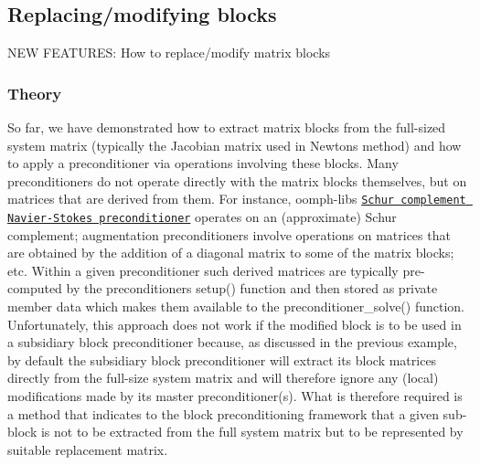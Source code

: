  

\hypertarget{index_two_plus_three_upper_triangular_with_replace}{}\subsection{Replacing/modifying blocks}\label{index_two_plus_three_upper_triangular_with_replace}
N\+EW F\+E\+A\+T\+U\+R\+ES\+: How to replace/modify matrix blocks\hypertarget{index_two_plus_three_upper_triangular_with_replace_theory}{}\subsubsection{Theory}\label{index_two_plus_three_upper_triangular_with_replace_theory}
So far, we have demonstrated how to extract matrix blocks from the full-\/sized system matrix (typically the Jacobian matrix used in Newton\textquotesingle{}s method) and how to apply a preconditioner via operations involving these blocks. Many preconditioners do not operate directly with the matrix blocks themselves, but on matrices that are derived from them. For instance, {\ttfamily oomph-\/lib}\textquotesingle{}s \href{../../../preconditioners/lsc_navier_stokes/html/index.html}{\tt Schur complement Navier-\/\+Stokes preconditioner} operates on an (approximate) Schur complement; augmentation preconditioners involve operations on matrices that are obtained by the addition of a diagonal matrix to some of the matrix blocks; etc. Within a given preconditioner such derived matrices are typically pre-\/computed by the preconditioner\textquotesingle{}s {\ttfamily setup()} function and then stored as private member data which makes them available to the {\ttfamily preconditioner\+\_\+solve()} function. Unfortunately, this approach does not work if the modified block is to be used in a subsidiary block preconditioner because, as discussed in the previous example, by default the subsidiary block preconditioner will extract its block matrices directly from the full-\/size system matrix and will therefore ignore any (local) modifications made by its master preconditioner(s). What is therefore required is a method that indicates to the block preconditioning framework that a given sub-\/block is not to be extracted from the full system matrix but to be represented by suitable replacement matrix.

